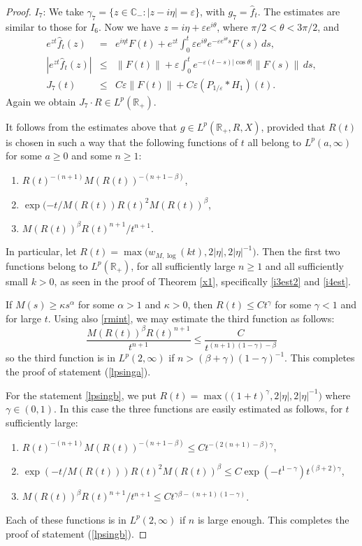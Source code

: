\documentclass[11pt]{amsart}
\theoremstyle{definition}
\theoremstyle{remark}
\numberwithin{equation}{section}
\begin{document}
\begin{proof}
\noindent $I_7$:  We take $\gamma_7 =  \{z\in {{\mathbb C}}_-: |z-i\eta| = {{\varepsilon}}\}$, with $g_7 = \widehat f_t$.  The estimates are similar to those for $I_6$.  Now we have $z = i\eta + {{\varepsilon}} e^{i\theta}$, where $\pi/2 < \theta < 3\pi/2$, and
\begin{eqnarray*}
e^{zt} \widehat f_t(z) &=& e^{i \eta t} F(t) + e^{zt} \int_0^t {{\varepsilon}} e^{i\theta} e^{- {{\varepsilon}} e^{i\theta} s} F(s) \, ds, \\
\left| e^{zt}  \widehat f_t(z) \right| &\le& \|F(t)\| + {{\varepsilon}} \int_0^t e^{-  {{\varepsilon}} (t-s) |\cos\theta|} \|F(s)\| \, ds, \\
J_7(t) &\le&  C {{\varepsilon}} \|F(t)\| + C {{\varepsilon}} (P_{1/{{\varepsilon}}} *  H_1)(t).
\end{eqnarray*}
Again we obtain $J_7 \cdot R \in L^p({{\mathbb R}}_+)$.

It follows from the estimates above that $g \in L^p({{\mathbb R}}_+,R,X)$, provided that $R(t)$ is chosen in such a way that the following functions of $t$ all belong to  $L^p(a,\infty)$ for some $a\ge0$ and some $n\ge1$:
\begin{enumerate}
\item  $R(t)^{-(n+1)} M(R(t))^{-(n+1-\beta)}$,
\item  $\exp(-t / M(R(t)) R(t)^{2} M(R(t))^\beta$,
\item  $M(R(t))^\beta R(t)^{n+1}/t^{n+1}$.
\end{enumerate}
In particular, let $R(t) = \max\big({w_{M,{\log}}}(kt),2|\eta|,2|\eta|^{-1}\big)$.  Then the first two functions belong to $L^p({{\mathbb R}}_+)$, for all sufficiently large $n\ge1$ and all sufficiently small $k>0$, as seen in the proof of Theorem \ref{x1}, specifically \eqref{i3est2} and \eqref{i4est}.

If $M(s) \ge \kappa s^\alpha$ for some $\alpha>1$ and $\kappa >0$, then $R(t)\le C t^\gamma$ for some $\gamma < 1$ and for large $t$.  Using also \eqref{rmint}, we may estimate the third function as follows:
$$
\frac {M(R(t))^\beta R(t)^{n+1}}{t^{n+1}} \le \frac{C}{t^{(n+1)(1-\gamma)-\beta}}
$$
 so the third function is in $L^p(2,\infty)$ if $n > (\beta+\gamma)(1-\gamma)^{-1}$.  This completes the proof of statement (\ref{lpsinga}).
{\relax}

For the statement \eqref{lpsingb}, we put $R(t) = \max\big((1+t)^\gamma,2|\eta|,2|\eta|^{-1}\big)$ where 
$\gamma \in (0,1)$.  In this case the three functions are easily estimated as follows, for $t$ sufficiently large:
\begin{enumerate}
\item  $R(t)^{-(n+1)} M(R(t))^{-(n+1-\beta)} \le C t^{-(2(n+1)-\beta)\gamma}$,
\item  $\exp(-t / M(R(t))) R(t)^{2} M(R(t))^\beta  \le C \exp(-t^{1-\gamma}) t^{(\beta+2)\gamma}$,
\item  $M(R(t))^\beta R(t)^{n+1}/t^{n+1} \le C t^{\gamma\beta - (n+1)(1-\gamma)}$.
\end{enumerate}
Each of these functions is in $L^p(2,\infty)$ if $n$ is large enough.  This completes the proof of statement (\ref{lpsingb}).
\end{proof}
\end{document}
